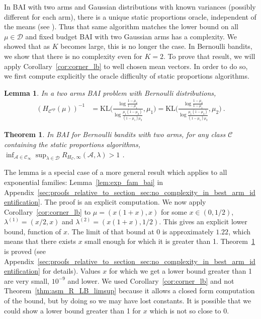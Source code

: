 \documentclass{article}
\newcommand{\KL}{\mathrm{KL}}
\newtheorem{theorem}{Theorem}
\newtheorem{lemma}{Lemma}
\begin{document}
In BAI with two arms and Gaussian distributions with known variances (possibly different for each arm), there is a unique static proportions oracle, independent of the means (see \cite{kaufmann2016complexity}). Thus that same algorithm matches the lower bound on all $\mu \in \mathcal D$ and fixed budget BAI with two Gaussian arms has a complexity. We showed that as $K$ becomes large, this is no longer the case.
In Bernoulli bandits, we show that there is no complexity even for $K = 2$.%
To prove that result, we will apply Corollary~\ref{cor:corner_lb} to well chosen mean vectors.
In order to do so, we first compute explicitly the oracle difficulty of static proportions algorithms.

\begin{lemma}\label{cor:bernoulli_bai_H}
In a two arms BAI problem with Bernoulli distributions,
\begin{align*}
(H_{\mathcal C^{sp}}(\mu))^{-1}
&= \KL\Big(\frac{\log\frac{1 - \mu_2}{1 - \mu_1}}{\log \frac{\mu_1(1 - \mu_2)}{(1 - \mu_1)\mu_2}}, \mu_1\Big)
= \KL\Big(\frac{\log\frac{1 - \mu_2}{1 - \mu_1}}{\log \frac{\mu_1(1 - \mu_2)}{(1 - \mu_1)\mu_2}}, \mu_2\Big)
\: .
\end{align*}
\end{lemma}

\begin{theorem}\label{thm:bernoulli_bai_no_complexity}
In BAI for Bernoulli bandits with two arms, for any class $\mathcal C$ containing the static proportions algorithms,
$
\inf_{\mathcal A \in \mathcal C_\infty} \sup_{\lambda \in \mathcal D} R_{H_{\mathcal C}, \infty}(\mathcal A, \lambda)
> 1
$ .
\end{theorem}

The lemma is a special case of a more general result which applies to all exponential families: Lemma~\ref{lem:exp_fam_bai} in Appendix~\ref{sec:proofs_relative_to_section_sec:no_complexity_in_best_arm_identification}.
The proof is an explicit computation.
We now apply Corollary~\ref{cor:corner_lb} to $\mu = (x(1+x), x)$ for some $x\in (0,1/2)$, $\lambda^{(1)} = (x/2, x)$ and $\lambda^{(2)} = (x(1+x), 1/2)$. This gives an explicit lower bound, function of $x$.
The limit of that bound at 0 is approximately $1.22$, which means that there exists $x$ small enough for which it is greater than 1.
Theorem~\ref{thm:bernoulli_bai_no_complexity} is proved (see Appendix~\ref{sec:proofs_relative_to_section_sec:no_complexity_in_best_arm_identification} for details).
Values $x$ for which we get a lower bound greater than 1 are very small, $10^{-9}$ and lower.
We used Corollary~\ref{cor:corner_lb} and not Theorem~\ref{thm:asm_R_LB_limsup} because it allows a closed form computation of the bound, but by doing so we may have lost constants. It is possible that we could show a lower bound greater than 1 for $x$ which is not so close to 0.
\end{document}
